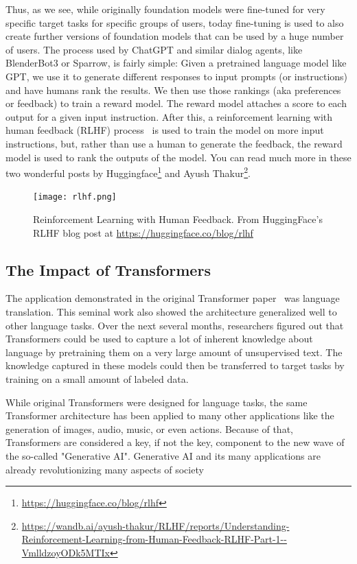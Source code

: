\documentclass{article}
\begin{document}
Thus, as we see, while originally foundation models were fine-tuned for very specific target tasks for specific groups of users, today fine-tuning is used to also create further versions of foundation models that can be used by a huge number of users. The process used by ChatGPT and similar dialog agents, like BlenderBot3 or Sparrow, is fairly simple: Given a pretrained language model like GPT, we use it to generate different responses to input prompts (or instructions) and have humans rank the results. We then use those rankings (aka preferences or feedback) to train a reward model. The reward model attaches a score to each output for a given input instruction. After this, a reinforcement learning with human feedback (RLHF) process~ is used to train the model on more input instructions, but, rather than use a human to generate the feedback, the reward model is used to rank the outputs of the model. You can read much more in these two wonderful posts by Huggingface\footnote{\url{https://huggingface.co/blog/rlhf}} and Ayush Thakur\footnote{\url{https://wandb.ai/ayush-thakur/RLHF/reports/Understanding-Reinforcement-Learning-from-Human-Feedback-RLHF-Part-1--VmlldzoyODk5MTIx}}.


\begin{figure}
    \centering
    \texttt{[image: rlhf.png]}
    \caption{Reinforcement Learning with Human Feedback. From HuggingFace’s RLHF blog post at \protect\url{https://huggingface.co/blog/rlhf}}
    \label{fig:rlhf}
\end{figure}

\subsection{The Impact of Transformers}

The application demonstrated in the original Transformer paper~ was language translation. This seminal work also showed the architecture generalized well to other language tasks. Over the next several months, researchers figured out that Transformers could be used to capture a lot of inherent knowledge about language by pretraining them on a very large amount of unsupervised text. The knowledge captured in these models could then be transferred to target tasks by training on a small amount of labeled data. 

While original Transformers were designed for language tasks, the same Transformer architecture has been applied to many other applications like the generation of images, audio, music, or even actions. Because of that, Transformers are considered a key, if not the key, component to the new wave of the so-called "Generative AI". Generative AI and its many applications are already revolutionizing many aspects of society~
\end{document}
